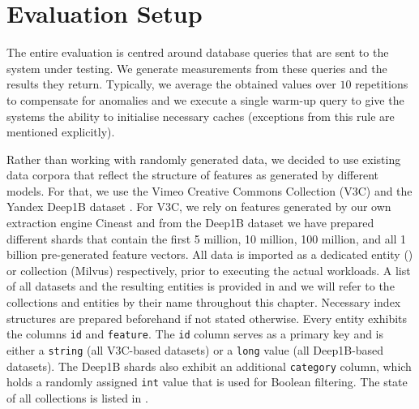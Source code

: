 \section{Evaluation Setup}

The entire evaluation is centred around database queries that are sent to the system under testing. We generate measurements from these queries and the results they return. Typically, we average the obtained values over $10$ repetitions to compensate for anomalies and we execute a single warm-up query to give the systems the ability to initialise necessary caches (exceptions from this rule are mentioned explicitly). 

Rather than working with randomly generated data, we decided to use existing data corpora that reflect the structure of features as generated by different models. For that, we use the Vimeo Creative Commons Collection (V3C) \cite{Berns:2019V3C1,Rossetto:2021Insights} and the Yandex Deep1B dataset \cite{Babenko:2016Efficient}. For V3C, we rely on features generated by our own extraction engine Cineast \cite{Rossetto:2016Vitrivr} and from the Deep1B dataset we have prepared different shards that contain the first 5 million, 10 million, 100 million, and all 1 billion pre-generated feature vectors. All data is imported as a dedicated entity (\cottontail{}) or collection (Milvus) respectively, prior to executing the actual workloads. A list of all datasets and the resulting entities is provided in  and we will refer to the collections and entities by their name throughout this chapter.
Necessary index structures are prepared beforehand if not stated otherwise. Every entity exhibits the columns \texttt{id} and \texttt{feature}. The \texttt{id} column serves as a primary key and is either a \texttt{string} (all V3C-based datasets) or a \texttt{long} value (all Deep1B-based datasets). The Deep1B shards also exhibit an additional \texttt{category} column, which holds a randomly assigned \texttt{int} value that is used for Boolean filtering. The state of all collections is listed in .

